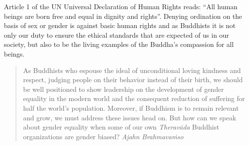 Article 1 of the UN Universal Declaration of Human Rights reads: ``All human beings are born free and equal in dignity and rights''. Denying ordination on the basis of sex or gender is against basic human rights and as Buddhists it is not only our duty to ensure the ethical standards that are expected of us in our society, but also to be the living examples of the Buddha's compassion for all beings.

\begin{quote}
As Buddhists who espouse the ideal of unconditional loving kindness and respect, judging people on their behavior instead of their birth, we should be well positioned to show leadership on the development of gender equality in the modern world and the consequent reduction of suffering for half the world's population. Moreover, if Buddhism is to remain relevant and grow, we must address these issues head on. But how can we speak about gender equality when some of our own \textit{Theravāda} Buddhist organizations are gender biased? \textit{Ajahn Brahmavaṁso}
\end{quote}
